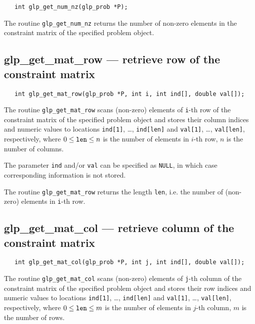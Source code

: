 \begin{verbatim}
   int glp_get_num_nz(glp_prob *P);
\end{verbatim}

\returns

The routine \verb|glp_get_num_nz| returns the number of non-zero
elements in the constraint matrix of the specified problem object.

\subsection{glp\_get\_mat\_row --- retrieve row of the constraint
matrix}

\synopsis

\begin{verbatim}
   int glp_get_mat_row(glp_prob *P, int i, int ind[], double val[]);
\end{verbatim}

\description

The routine \verb|glp_get_mat_row| scans (non-zero) elements of
\verb|i|-th row of the constraint matrix of the specified problem
object and stores their column indices and numeric values to locations
\verb|ind[1]|, \dots, \verb|ind[len]| and \verb|val[1]|, \dots,
\verb|val[len]|, respectively, where $0\leq{\tt len}\leq n$ is the
number of elements in $i$-th row, $n$ is the number of columns.

The parameter \verb|ind| and/or \verb|val| can be specified as
\verb|NULL|, in which case corresponding information is not stored.

\newpage

\returns

The routine \verb|glp_get_mat_row| returns the length \verb|len|, i.e.
the number of (non-zero) elements in \verb|i|-th row.

\subsection{glp\_get\_mat\_col --- retrieve column of the constraint
matrix}

\synopsis

\begin{verbatim}
   int glp_get_mat_col(glp_prob *P, int j, int ind[], double val[]);
\end{verbatim}

\description

The routine \verb|glp_get_mat_col| scans (non-zero) elements of
\verb|j|-th column of the constraint matrix of the specified problem
object and stores their row indices and numeric values to locations
\linebreak \verb|ind[1]|, \dots, \verb|ind[len]| and \verb|val[1]|,
\dots, \verb|val[len]|, respectively, where $0\leq{\tt len}\leq m$ is
the number of elements in $j$-th column, $m$ is the number of rows.

